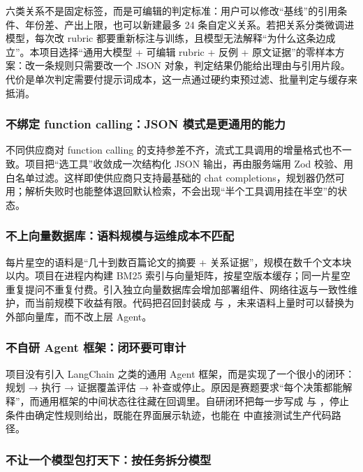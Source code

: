 六类关系不是固定标签，而是可编辑的判定标准：用户可以修改“基线”的引用条件、年份差、产出上限，也可以新建最多 24 条自定义关系。若把关系分类微调进模型，每次改 rubric 都要重新标注与训练，且模型无法解释“为什么这条边成立”。本项目选择“通用大模型 + 可编辑 rubric + 反例 + 原文证据”的零样本方案：改一条规则只需要改一个 JSON 对象，判定结果仍能给出理由与引用片段。代价是单次判定需要付提示词成本，这一点通过硬约束预过滤、批量判定与缓存来抵消。

\subsubsection{不绑定 function calling：JSON 模式是更通用的能力}

不同供应商对 function calling 的支持参差不齐，流式工具调用的增量格式也不一致。项目把“选工具”收敛成一次结构化 JSON 输出，再由服务端用 Zod 校验、用白名单过滤。这样即使供应商只支持最基础的 chat completions，规划器仍然可用；解析失败时也能整体退回默认检索，不会出现“半个工具调用挂在半空”的状态。

\subsubsection{不上向量数据库：语料规模与运维成本不匹配}

每片星空的语料是“几十到数百篇论文的摘要 + 关系证据”，规模在数千个文本块以内。项目在进程内构建 BM25 索引与向量矩阵，按星空版本缓存；同一片星空重复提问不重复付费。引入独立向量数据库会增加部署组件、网络往返与一致性维护，而当前规模下收益有限。代码把召回封装成  与 ，未来语料上量时可以替换为外部向量库，而不改上层 Agent。

\subsubsection{不自研 Agent 框架：闭环要可审计}

项目没有引入 LangChain 之类的通用 Agent 框架，而是实现了一个很小的闭环：规划 → 执行 → 证据覆盖评估 → 补查或停止。原因是赛题要求“每个决策都能解释”，而通用框架的中间状态往往藏在回调里。自研闭环把每一步写成  与 ，停止条件由确定性规则给出，既能在界面展示轨迹，也能在  中直接测试生产代码路径。

\subsubsection{不让一个模型包打天下：按任务拆分模型}


